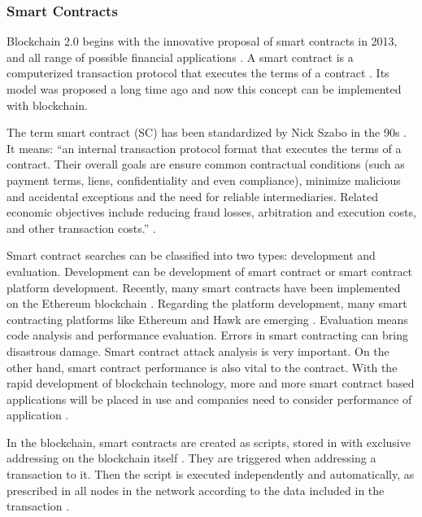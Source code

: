 \subsubsection{Smart Contracts}\label{sec:smartContracts}

Blockchain 2.0 begins with the innovative proposal of smart contracts in 2013, and all range of possible financial applications \cite{greve2018blockchain}. A smart contract is a computerized transaction protocol that executes the terms of a contract \cite{szabo1997idea}. Its model was proposed a long time ago and now this concept can be implemented with blockchain.

The term smart contract (SC) has been standardized by Nick Szabo in the 90s \cite{greve2018blockchain}. It means: “an internal transaction protocol format that executes the terms of a contract. Their overall goals are ensure common contractual conditions (such as payment terms, liens, confidentiality and even compliance), minimize malicious and accidental exceptions and the need for reliable intermediaries. Related economic objectives include reducing fraud losses, arbitration and execution costs, and other transaction costs.” \cite{szabo1997idea}.

Smart contract searches can be classified into two types: development and evaluation. Development can be development of smart contract or smart contract platform development. Recently, many smart contracts have been implemented on the Ethereum blockchain \cite{wood2018secure}. Regarding the platform development, many smart contracting platforms like Ethereum \cite{wood2018secure} and Hawk \cite{kosbaa2016theblockchain} are emerging \cite{zheng2016blockchain}. Evaluation means code analysis and performance evaluation. Errors in smart contracting can bring disastrous damage. Smart contract attack analysis is very important. On the other hand, smart contract performance is also vital to the contract. With the rapid development of blockchain technology, more and more smart contract based applications will be placed in use and companies need to consider performance of application \cite{zheng2016blockchain}.

In the blockchain, smart contracts are created as scripts, stored in with exclusive addressing on the blockchain itself \cite{greve2018blockchain}. They are triggered when addressing a transaction to it. Then the script is executed independently and automatically, as prescribed in all nodes in the network according to the data included in the transaction \cite{christidis2016blockchains}.

